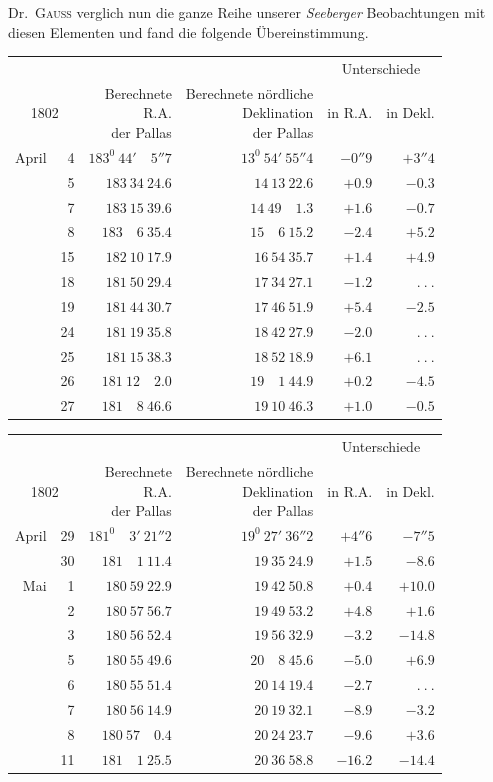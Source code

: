 Dr.\ \textsc{Gauß} verglich nun die ganze Reihe unserer \textit{Seeberger} Beobachtungen mit diesen Elementen und fand die folgende Übereinstimmung.
\begin{center}
{\small\setlength{\tabcolsep}{5pt}
\begin{tabular}{r r|r|r|r|r}
\multicolumn{2}{c|}{}&&&\multicolumn{2}{c}{Unterschiede}\\
\multicolumn{2}{c|}{1802}&\shortstack{Berechnete\\R.A.\\der Pallas}&\shortstack{Berechnete nördliche\\Deklination\\der Pallas}&in R.A.&in Dekl.\\\hline
April&4&$183^0\ 44'\quad5''7$&$13^0\ 54'\ 55''4$&$-0''9$&$+3''4$\\
&5&$183\ 34\ 24.6$&$14\ 13\ 22.6$&$+0.9$&$-0.3$\\
&7&$183\ 15\ 39.6$&$14\ 49\quad1.3$&$+1.6$&$-0.7$\\
&8&$183\quad6\ 35.4$&$15\quad6\ 15.2$&$-2.4$&$+5.2$\\
&15&$182\ 10\ 17.9$&$16\ 54\ 35.7$&$+1.4$&$+4.9$\\
&18&$181\ 50\ 29.4$&$17\ 34\ 27.1$&$-1.2$&$\ .\ .\ .$\\
&19&$181\ 44\ 30.7$&$17\ 46\ 51.9$&$+5.4$&$-2.5$\\
&24&$181\ 19\ 35.8$&$18\ 42\ 27.9$&$-2.0$&$\ .\ .\ .$\\
&25&$181\ 15\ 38.3$&$18\ 52\ 18.9$&$+6.1$&$\ .\ .\ .$\\
&26&$181\ 12\quad2.0$&$19\quad1\ 44.9$&$+0.2$&$-4.5$\\
&27&$181\quad8\ 46.6$&$19\ 10\ 46.3$&$+1.0$&$-0.5$
\end{tabular}
\par\medskip
\begin{tabular}{r r|r|r|r|r}
\multicolumn{2}{c|}{}&&&\multicolumn{2}{c}{Unterschiede}\\
\multicolumn{2}{c|}{1802}&\shortstack{Berechnete\\R.A.\\der Pallas}&\shortstack{Berechnete nördliche\\Deklination\\der Pallas}&in R.A.&in Dekl.\\\hline
April&29&$181^0\quad3'\ 21''2$&$19^0\ 27'\ 36''2$&$+4''6$&$-7''5$\\
&30&$181\quad1\ 11.4$&$19\ 35\ 24.9$&$+1.5$&$-8.6$\\
Mai&1&$180\ 59\ 22.9$&$19\ 42\ 50.8$&$+0.4$&$+10.0$\\
&2&$180\ 57\ 56.7$&$19\ 49\ 53.2$&$+4.8$&$+1.6$\\
&3&$180\ 56\ 52.4$&$19\ 56\ 32.9$&$-3.2$&$-14.8$\\
&5&$180\ 55\ 49.6$&$20\quad8\ 45.6$&$-5.0$&$+6.9$\\
&6&$180\ 55\ 51.4$&$20\ 14\ 19.4$&$-2.7$&$\ .\ .\ .$\\
&7&$180\ 56\ 14.9$&$20\ 19\ 32.1$&$-8.9$&$-3.2$\\
&8&$180\ 57\quad0.4$&$20\ 24\ 23.7$&$-9.6$&$+3.6$\\
&11&$181\quad1\ 25.5$&$20\ 36\ 58.8$&$-16.2$&$-14.4$
\end{tabular}}
\end{center}
